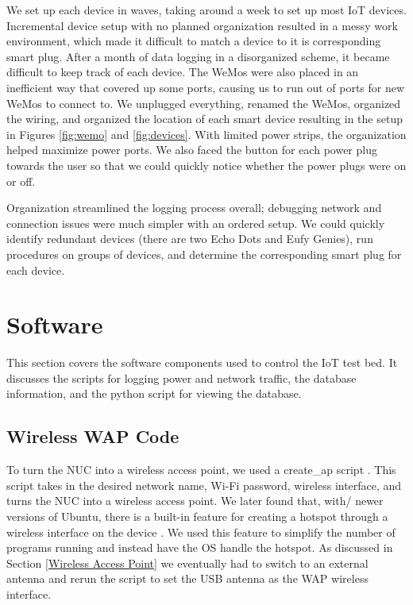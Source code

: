 We set up each device in waves, taking around a week to set up most IoT devices. Incremental device setup with no planned organization resulted in a messy work environment, which made it difficult to match a device to it is corresponding smart plug. After a month of data logging in a disorganized scheme, it became difficult to keep track of each device. The WeMos were also placed in an inefficient way that covered up some ports, causing us to run out of ports for new WeMos to connect to. We unplugged everything, renamed the WeMos, organized the wiring, and organized the location of each smart device resulting in the setup in Figures \ref{fig:wemo} and \ref{fig:devices}. With limited power strips, the organization helped maximize power ports. We also faced the button for each power plug towards the user so that we could quickly notice whether the power plugs were on or off.

Organization streamlined the logging process overall; debugging network and connection issues were much simpler with an ordered setup. We could quickly identify redundant devices (there are two Echo Dots and Eufy Genies), run procedures on groups of devices, and determine the corresponding smart plug for each device.

\section{Software}
\label{software}
This section covers the software components used to control the IoT test bed. It discusses the scripts for logging power and network traffic, the database information, and the python script for viewing the database.

\subsection{Wireless WAP Code}
To turn the NUC into a wireless access point, we used a create\_ap script \cite{oblique_2017}. This script takes in the desired network name, Wi-Fi password, wireless interface, and turns the NUC into a wireless access point. We later found that, with/ newer versions of Ubuntu, there is a built-in feature for creating a hotspot through a wireless interface on the device \cite{m_2016}. We used this feature to simplify the number of programs running and instead have the OS handle the hotspot. As discussed in Section \ref{Wireless Access Point} we eventually had to switch to an external antenna and rerun the script to set the USB antenna as the WAP wireless interface.

